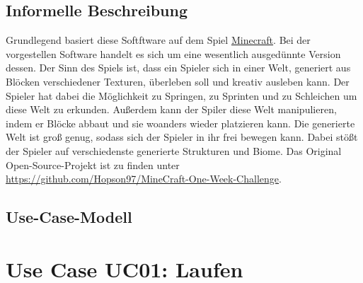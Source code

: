 \documentclass{article}
\begin{document}
\subsection{Informelle Beschreibung} \label{subsec:inf}

Grundlegend basiert diese Softftware auf dem Spiel \href{https://www.minecraft.net}{Minecraft}. Bei der vorgestellen Software handelt es sich um eine wesentlich ausgedünnte Version dessen. Der Sinn des Spiels ist, dass ein Spieler sich in einer Welt, generiert aus Blöcken verschiedener Texturen, überleben soll und kreativ ausleben kann. Der Spieler hat dabei die Möglichkeit zu Springen, zu Sprinten und zu Schleichen um diese Welt zu erkunden. Außerdem kann der Spiler diese Welt manipulieren, indem er Blöcke abbaut und sie woanders wieder platzieren kann. Die generierte Welt ist groß genug, sodass sich der Spieler in ihr frei bewegen kann. Dabei stößt der Spieler auf verschiedenste generierte Strukturen und Biome. Das Original Open-Source-Projekt ist zu finden unter \url{https://github.com/Hopson97/MineCraft-One-Week-Challenge}.

\subsection{Use-Case-Modell} \label{subsec:usecase}

\begin{center}
\end{center}

\section*{Use Case UC01: Laufen}
\end{document}

